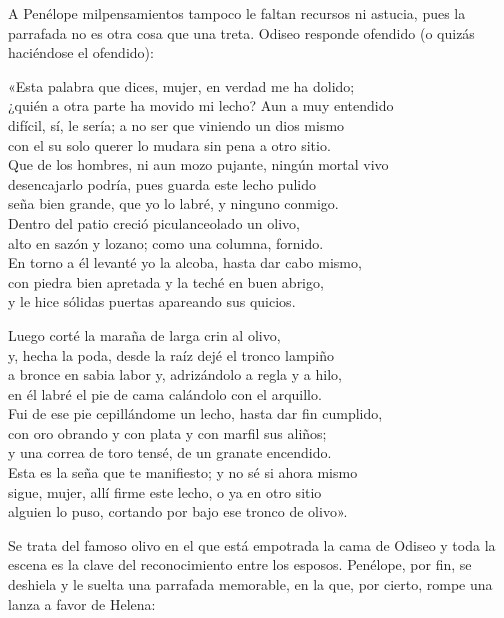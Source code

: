 A Penélope milpensamientos tampoco le faltan recursos ni astucia, pues la parrafada no es otra cosa que una treta. Odiseo responde ofendido (o quizás haciéndose el ofendido):

\begin{versocita}
«Esta palabra que dices, mujer, en verdad me ha dolido;\\
¿quién a otra parte ha movido mi lecho? Aun a muy entendido\\
difícil, sí, le sería; a no ser que viniendo un dios mismo\\
con el su solo querer lo mudara sin pena a otro sitio.\\
Que de los hombres, ni aun mozo pujante, ningún mortal vivo\\
desencajarlo podría, pues guarda este lecho pulido\\
seña bien grande, que yo lo labré, y ninguno conmigo.\\
Dentro del patio creció piculanceolado un olivo,\\
alto en sazón y lozano; como una columna, fornido.\\
En torno a él levanté yo la alcoba, hasta dar cabo mismo,\\
con piedra bien apretada y la teché en buen abrigo,\\
y le hice sólidas puertas apareando sus quicios.

Luego corté la maraña de larga crin al olivo,\\
y, hecha la poda, desde la raíz dejé el tronco lampiño\\
a bronce en sabia labor y, adrizándolo a regla y a hilo,\\
en él labré el pie de cama calándolo con el arquillo.\\
Fui de ese pie cepillándome un lecho, hasta dar fin cumplido,\\
con oro obrando y con plata y con marfil sus aliños;\\
y una correa de toro tensé, de un granate encendido.\\
Esta es la seña que te manifiesto; y no sé si ahora mismo\\
sigue, mujer, allí firme este lecho, o ya en otro sitio\\
alguien lo puso, cortando por bajo ese tronco de olivo».
\end{versocita}

Se trata del famoso olivo en el que está empotrada la cama de Odiseo y toda la escena es la clave del reconocimiento entre los esposos. Penélope, por fin, se deshiela y le suelta una parrafada memorable, en la que, por cierto, rompe una lanza a favor de Helena:

